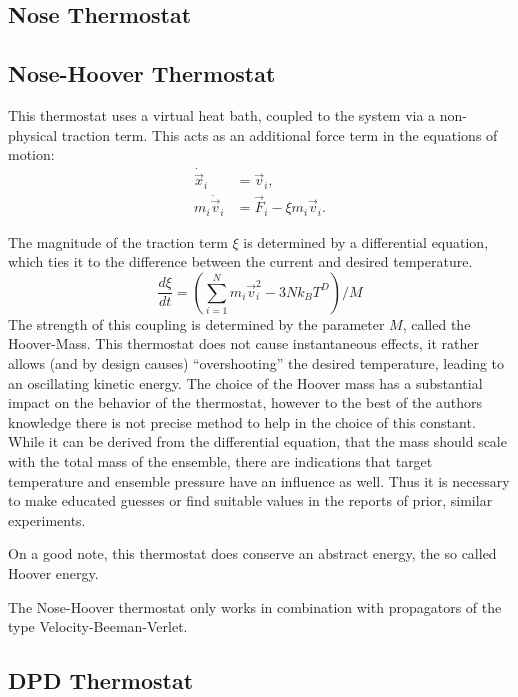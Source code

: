 \subsection{Nose Thermostat}

\subsection{Nose-Hoover Thermostat}
This thermostat uses a virtual heat bath, coupled to the system via a non-physical traction term. This acts as an additional force term in the equations of motion:
\begin{align*}
\dot{\vec{x}}_i & =\vec{v}_i,\\
m_i\dot{\vec{v}}_i & =\vec{F}_i-\xi m_i\vec{v}_i.
\end{align*}

The magnitude of the traction term $\xi$ is determined by a differential equation, which ties it to the difference between the current and desired temperature. 
\begin{equation*}
\frac{d\xi}{dt}=\left( \sum_{i=1}^N m_i\vec{v}_i^2 - 3Nk_BT^D \right)/M
\end{equation*}
The strength of this coupling is determined by the parameter $M$, called the Hoover-Mass.
This thermostat does not cause instantaneous effects, it rather allows (and by design causes) ``overshooting'' the desired temperature, leading to an oscillating kinetic energy. 
The choice of the Hoover mass has a substantial impact on the behavior of the thermostat, however to the best of the authors knowledge there is not precise method to help in the 
choice of this constant. 
While it can be derived from the differential equation, that the mass should scale with the total mass of the ensemble, there are indications that target temperature and ensemble
pressure have an influence as well. Thus it is necessary to make educated guesses or find suitable values in the reports of prior, similar experiments.

On a good note, this thermostat does conserve an abstract energy, the so called Hoover energy.

The Nose-Hoover thermostat only works in combination with propagators of the type Velocity-Beeman-Verlet.


\subsection{DPD Thermostat}

